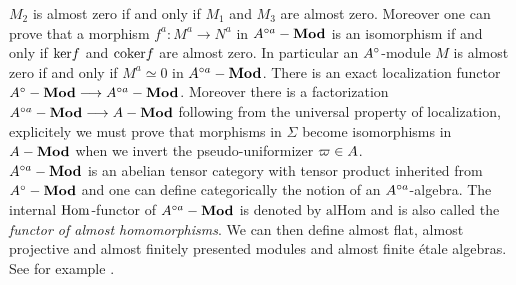 $M_2$ is almost zero if and only if $M_1$ and $M_3$ are almost zero. Moreover one can prove that
a morphism $f^a\colon M^a\to N^a$ in $A{^{\circ a}}-\mathbf{Mod}$ is an isomorphism if and only if ${\rm{ker}} f$ and ${\rm{coker}} f$ are almost zero. 
In particular an $A{^{\circ}}$-module $M$ is almost zero if and only if $M^a\simeq 0$ in $A{^{\circ a}}-\mathbf{Mod}$.
There is an exact localization functor $A{^{\circ}}-\mathbf{Mod}\longrightarrow A{^{\circ a}}-\mathbf{Mod}$.
Moreover there is a factorization $A{^{\circ a}}-\mathbf{Mod}\longrightarrow A-\mathbf{Mod}$ following from the universal property of localization, explicitely 
we must prove that morphisms in $\Sigma$ become isomorphisms in $A-\mathbf{Mod}$ when we invert the pseudo-uniformizer $\varpi\in A$.\\


 $A{^{\circ a}}-\mathbf{Mod}$ is an abelian tensor category with tensor product inherited from $A{^{\circ}}-\mathbf{Mod}$ and one can define categorically the notion of an $A{^{\circ a}}$-algebra.
The internal ${\rm{Hom}}$-functor of $A{^{\circ a}}-\mathbf{Mod}$ is denoted by $\mathrm{alHom}$ and is also called the \emph{functor of almost homomorphisms}.
We can then define almost flat, almost projective and almost finitely presented modules and almost finite \'{e}tale algebras. See for example \cite[chapter 4]{Scholze12}.


































